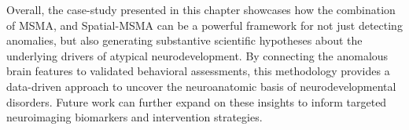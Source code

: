 Overall, the case-study presented in this chapter showcases how the combination of MSMA, and Spatial-MSMA can be a powerful framework for not just detecting anomalies, but also generating substantive scientific hypotheses about the underlying drivers of atypical neurodevelopment. By connecting the anomalous brain features to validated behavioral assessments, this methodology provides a data-driven approach to uncover the neuroanatomic basis of neurodevelopmental disorders. Future work can further expand on these insights to inform targeted neuroimaging biomarkers and intervention strategies.